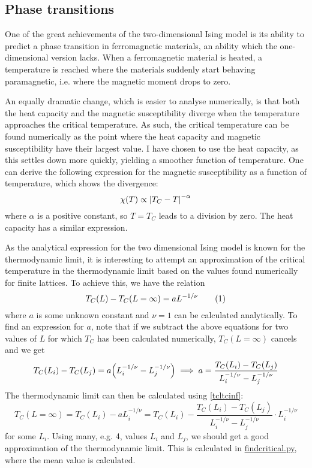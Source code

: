 \documentclass[12pt,english,a4paper]{article}
\newcommand{\eqtag}[1]{\refstepcounter{equation}\tag{\theequation}\label{#1}}
\newcommand{\program}[1]{\href{https://github.com/anjohan/Offentlig/blob/master/FYS3150/Oblig4/#1}{#1}}
\begin{document}
\subsection{Phase transitions}
One of the great achievements of the two-dimensional Ising model is its ability to predict a phase transition in ferromagnetic materials, an ability which the one-dimensional version lacks. When a ferromagnetic material is heated, a temperature is reached where the materials suddenly start behaving paramagnetic, i.e. where the magnetic moment drops to zero.

An equally dramatic change, which is easier to analyse numerically, is that both the heat capacity and the magnetic susceptibility diverge when the temperature approaches the critical temperature. As such, the critical temperature can be found numerically as the point where the heat capacity and magnetic susceptibility have their largest value. I have chosen to use the heat capacity, as this settles down more quickly, yielding a smoother function of temperature. One can derive the following expression for the magnetic susceptibility as a function of temperature, which shows the divergence:
\[
\chi(T) \propto \abs{T_C-T}^{-\alpha}
\]
where \(\alpha\) is a positive constant, so \(T=T_C\) leads to a division by zero. The heat capacity has a similar expression.

As the analytical expression for the two dimensional Ising model is known for the thermodynamic limit, it is interesting to attempt an approximation of the critical temperature in the thermodynamic limit based on the values found numerically for finite lattices. To achieve this, we have the relation
\[
T_C(L) - T_C(L=\infty) = aL^{-1/\nu}\eqtag{tcltcinf}
\]
where \(a\) is some unknown constant and \(\nu=1\) can be calculated analytically. To find an expression for \(a\), note that if we subtract the above equations for two values of \(L\) for which \(T_C\) has been calculated numerically, \(T_C(L=\infty)\) cancels and we get
\[
T_C(L_i) - T_C(L_j) = a\qty(L_i^{-1/\nu} - L_j^{-1/\nu}) \implies a = \frac{T_C(L_i)-T_C(L_j)}{L_i^{-1/\nu}-L_j^{-1/\nu}}
\]
The thermodynamic limit can then be calculated using \ref{tcltcinf}:
\[
T_C(L=\infty)=T_C(L_i)-aL_i^{-1/\nu} = T_C(L_i)- \frac{T_C(L_i)-T_C(L_j)}{L_i^{-1/\nu}-L_j^{-1/\nu}}\cdot L_i^{-1/\nu}
\]
for some \(L_i\). Using many, e.g. 4, values \(L_i\) and \(L_j\), we should get a good approximation of the thermodynamic limit. This is calculated in \program{findcritical.py}, where the mean value is calculated.
\end{document}
